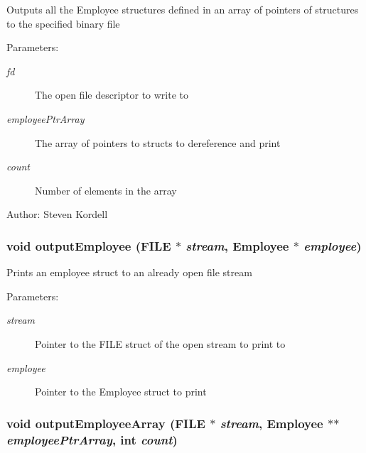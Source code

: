 Outputs all the Employee structures defined in an array of pointers of structures to the specified binary file \begin{Desc}
\item[Parameters:]
\begin{description}
\item[{\em fd}]The open file descriptor to write to \item[{\em employee\-Ptr\-Array}]The array of pointers to structs to dereference and print \item[{\em count}]Number of elements in the array \end{description}
\end{Desc}
\begin{Desc}
\item[Author:]Steven Kordell \end{Desc}
\subsubsection{\setlength{\rightskip}{0pt plus 5cm}void output\-Employee (FILE $\ast$ {\em stream}, \bf{Employee} $\ast$ {\em employee})}\label{employeef_8h_fe0dfee3a22cda6855e076582ce67058}


Prints an employee struct to an already open file stream \begin{Desc}
\item[Parameters:]
\begin{description}
\item[{\em stream}]Pointer to the FILE struct of the open stream to print to \item[{\em employee}]Pointer to the Employee struct to print \end{description}
\end{Desc}
\subsubsection{\setlength{\rightskip}{0pt plus 5cm}void output\-Employee\-Array (FILE $\ast$ {\em stream}, \bf{Employee} $\ast$$\ast$ {\em employee\-Ptr\-Array}, int {\em count})}\label{employeef_8h_63d15476d6b50d78ee285183938d091b}


